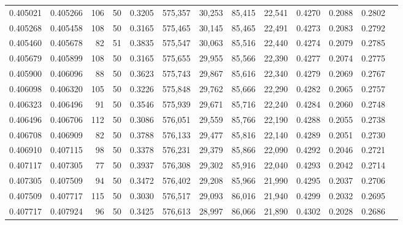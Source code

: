 \begin{tabular}{rrrrrrrrrrrrr}
0.405021 & 0.405266 &   106 &  50 &                                     0.3205 & 575,357 &  30,253 &  85,415 &  22,541 & 0.4270 & 0.2088 & 0.2802 \\
0.405268 & 0.405458 &   108 &  50 &                                     0.3165 & 575,465 &  30,145 &  85,465 &  22,491 & 0.4273 & 0.2083 & 0.2792 \\
0.405460 & 0.405678 &    82 &  51 &                                     0.3835 & 575,547 &  30,063 &  85,516 &  22,440 & 0.4274 & 0.2079 & 0.2785 \\
0.405679 & 0.405899 &   108 &  50 &                                     0.3165 & 575,655 &  29,955 &  85,566 &  22,390 & 0.4277 & 0.2074 & 0.2775 \\
0.405900 & 0.406096 &    88 &  50 &                                     0.3623 & 575,743 &  29,867 &  85,616 &  22,340 & 0.4279 & 0.2069 & 0.2767 \\
0.406098 & 0.406320 &   105 &  50 &                                     0.3226 & 575,848 &  29,762 &  85,666 &  22,290 & 0.4282 & 0.2065 & 0.2757 \\
0.406323 & 0.406496 &    91 &  50 &                                     0.3546 & 575,939 &  29,671 &  85,716 &  22,240 & 0.4284 & 0.2060 & 0.2748 \\
0.406496 & 0.406706 &   112 &  50 &                                     0.3086 & 576,051 &  29,559 &  85,766 &  22,190 & 0.4288 & 0.2055 & 0.2738 \\
0.406708 & 0.406909 &    82 &  50 &                                     0.3788 & 576,133 &  29,477 &  85,816 &  22,140 & 0.4289 & 0.2051 & 0.2730 \\
0.406910 & 0.407115 &    98 &  50 &                                     0.3378 & 576,231 &  29,379 &  85,866 &  22,090 & 0.4292 & 0.2046 & 0.2721 \\
0.407117 & 0.407305 &    77 &  50 &                                     0.3937 & 576,308 &  29,302 &  85,916 &  22,040 & 0.4293 & 0.2042 & 0.2714 \\
0.407305 & 0.407509 &    94 &  50 &                                     0.3472 & 576,402 &  29,208 &  85,966 &  21,990 & 0.4295 & 0.2037 & 0.2706 \\
0.407509 & 0.407717 &   115 &  50 &                                     0.3030 & 576,517 &  29,093 &  86,016 &  21,940 & 0.4299 & 0.2032 & 0.2695 \\
0.407717 & 0.407924 &    96 &  50 &                                     0.3425 & 576,613 &  28,997 &  86,066 &  21,890 & 0.4302 & 0.2028 & 0.2686 \\

\end{tabular}
